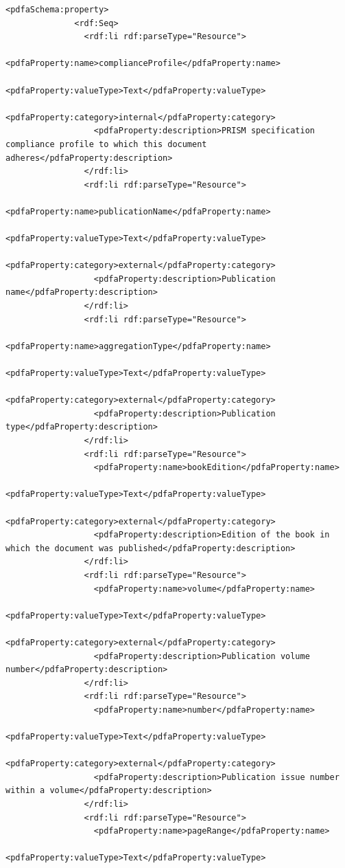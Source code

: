 \documentclass[12pt, twoside]{article}
\begin{document}
\begin{lstlisting}[style=myXML,
caption={Second part of the XML metadata embedded in a PDF file (some reformatting has been done to fit the text in the borders)}, label={lst:pdfinfoOutputPart2}]
            <pdfaSchema:property>
              <rdf:Seq>
                <rdf:li rdf:parseType="Resource">
                  <pdfaProperty:name>complianceProfile</pdfaProperty:name>
                  <pdfaProperty:valueType>Text</pdfaProperty:valueType>
                  <pdfaProperty:category>internal</pdfaProperty:category>
                  <pdfaProperty:description>PRISM specification compliance profile to which this document adheres</pdfaProperty:description>
                </rdf:li>
                <rdf:li rdf:parseType="Resource">
                  <pdfaProperty:name>publicationName</pdfaProperty:name>
                  <pdfaProperty:valueType>Text</pdfaProperty:valueType>
                  <pdfaProperty:category>external</pdfaProperty:category>
                  <pdfaProperty:description>Publication name</pdfaProperty:description>
                </rdf:li>
                <rdf:li rdf:parseType="Resource">
                  <pdfaProperty:name>aggregationType</pdfaProperty:name>
                  <pdfaProperty:valueType>Text</pdfaProperty:valueType>
                  <pdfaProperty:category>external</pdfaProperty:category>
                  <pdfaProperty:description>Publication type</pdfaProperty:description>
                </rdf:li>
                <rdf:li rdf:parseType="Resource">
                  <pdfaProperty:name>bookEdition</pdfaProperty:name>
                  <pdfaProperty:valueType>Text</pdfaProperty:valueType>
                  <pdfaProperty:category>external</pdfaProperty:category>
                  <pdfaProperty:description>Edition of the book in which the document was published</pdfaProperty:description>
                </rdf:li>
                <rdf:li rdf:parseType="Resource">
                  <pdfaProperty:name>volume</pdfaProperty:name>
                  <pdfaProperty:valueType>Text</pdfaProperty:valueType>
                  <pdfaProperty:category>external</pdfaProperty:category>
                  <pdfaProperty:description>Publication volume number</pdfaProperty:description>
                </rdf:li>
                <rdf:li rdf:parseType="Resource">
                  <pdfaProperty:name>number</pdfaProperty:name>
                  <pdfaProperty:valueType>Text</pdfaProperty:valueType>
                  <pdfaProperty:category>external</pdfaProperty:category>
                  <pdfaProperty:description>Publication issue number within a volume</pdfaProperty:description>
                </rdf:li>
                <rdf:li rdf:parseType="Resource">
                  <pdfaProperty:name>pageRange</pdfaProperty:name>
                  <pdfaProperty:valueType>Text</pdfaProperty:valueType>

\end{lstlisting}
\end{document}
